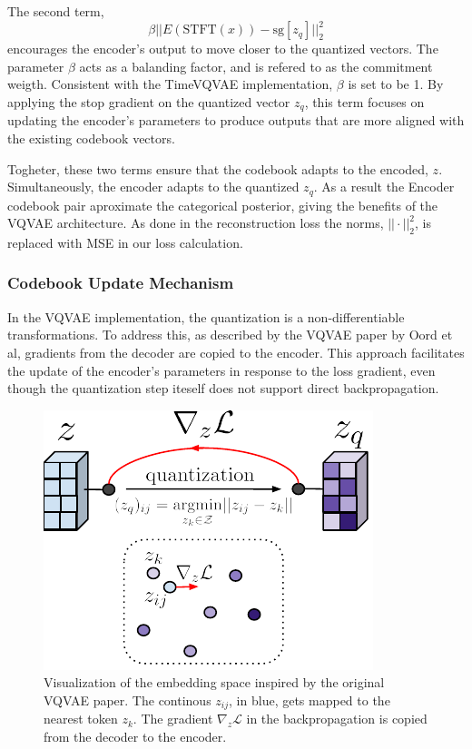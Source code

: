 The second term,
\begin{equation}
    \beta|| E(\text{STFT}(x)) - \text{sg}\left[ z_q \right]||_2^2
\end{equation}
encourages the encoder's output to move closer to the quantized vectors. The parameter $\beta$ acts as a balanding factor, and is refered to as the commitment weigth. Consistent with the TimeVQVAE implementation, $\beta$ is set to be 1.
By applying the stop gradient on the quantized vector $z_q$, this term focuses on updating the encoder's parameters to produce outputs that are more aligned with the existing
codebook vectors.

Togheter, these two terms ensure that the codebook adapts to the encoded, $z$. Simultaneously, the encoder adapts to the quantized $z_q$. As a result the Encoder codebook pair aproximate the categorical posterior, giving the benefits of the VQVAE architecture.
As done in the reconstruction loss the norms, $||\cdot||_2^2$, is replaced with MSE in our loss calculation.

\subsubsection{Codebook Update Mechanism}
In the VQVAE implementation, the quantization is a non-differentiable transformations. To address this, as described by the VQVAE paper by Oord et al\cite{neuvqvae}, gradients from the decoder are copied to the encoder. 
This approach facilitates the update of the encoder's parameters in response to the loss gradient, even though the quantization step iteself does not support direct backpropagation.

\begin{figure}[H]
    \includegraphics{figures/figure-pdf/gradients.pdf}
    \caption{Visualization of the embedding space inspired by the original VQVAE paper\cite{neuvqvae}. The continous $z_{ij}$, in blue, gets mapped to the nearest token $z_k$. The gradient $\nabla_z \mathcal{L}$ in the backpropagation is copied from the decoder to the encoder. }
\end{figure}

